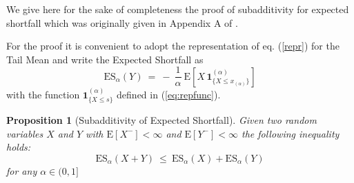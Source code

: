 \documentclass[11pt,a4paper,leqno]{article}
\newtheorem{proposition}[theorem]{Proposition}
\renewcommand{\theequation}{\arabic{section}.\arabic{equation}}
\begin{document}
\renewcommand{\theequation}{{\rm{}A}.\arabic{equation}}


We give here for the sake of completeness the proof of subadditivity for expected shortfall which was originally given in Appendix A of \cite{ANS}. 

For the proof it is convenient to adopt the representation of eq. (\ref{repr}) for the Tail Mean and write the Expected Shortfall as
\begin{equation}
\mathrm{ES}_\alpha (Y) \: = \: - \:\frac{1}{\alpha}\: \mathrm{E}[ X\,\mathbf{1}_{\{X \le x_{(\alpha)}\}}^{(\alpha)}]
\end{equation}
with the function $\mathbf{1}_{\{X\leq s\}}^{(\alpha)}$ defined in (\ref{eq:repfunc}).


\begin{proposition}[Subadditivity of Expected Shortfall]%
\label{pr:A}%
Given two random variables $X$ and $Y$ with
$\mathrm{E}[X^-]<\infty$ and $\mathrm{E}[Y^-]<\infty$ the following inequality holds:
\begin{equation}
\mathrm{ES}_\alpha (X+Y)\ \leq\ \mathrm{ES}_\alpha (X) + \mathrm{ES}_\alpha (Y) 
\end{equation}
for any $\alpha \in (0,1]$
\end{proposition}
\end{document}
